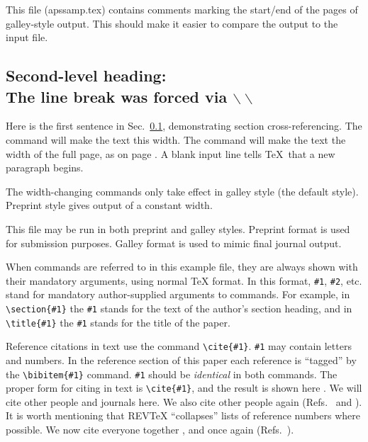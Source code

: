 This file (apssamp.tex) contains comments marking the start/end of the
pages of galley-style output. This should make it easier to compare the
output to the input file.

\subsection{Second-level heading:\protect\\ The line break was forced via
$\backslash\backslash$}
\label{sec:level2}

Here is the first sentence in Sec.\ \ref{sec:level2}, demonstrating
section cross-referencing.
The command 
will make the text this width. The command 
will make the text the width of the full page, as on page \pageref{wideeq}.
A blank input line tells \TeX\ that a new paragraph begins.

The width-changing commands only take effect in galley style (the default
style). Preprint style gives output of a constant width.

This file may be run in both preprint and galley styles. Preprint
format is used for submission purposes. Galley format is used to mimic
final journal output. 

When commands are referred to in this example file, they are always shown
with their mandatory arguments, using normal \TeX{} format. In this format,
\verb+#1+, \verb+#2+, etc. stand for mandatory
author-supplied arguments to commands.
For example, in
\verb+\section{#1}+ the \verb+#1+ stands for the text of the author's section
heading, and in \verb+\title{#1}+ the \verb+#1+ stands for the
title of the paper.


Reference citations in text use the command \verb+\cite{#1}+.
\verb+#1+ may contain letters and numbers.
In the reference section of this paper
each reference is ``tagged'' by the \verb+\bibitem{#1}+ command.
\verb+#1+ should be {\em identical\/} in both commands.
The proper form for citing in text is
\verb+\cite{#1}+,
and the result is shown here \cite{smith82,jones78}.
We will cite  other people \cite{smith82,jonessmith80}
and journals here. We also cite other people again (Refs.\
 and ).
It is worth mentioning that REV\TeX{} ``collapses'' lists
of reference numbers where possible.  We now cite
everyone together \cite{smith82,jones78,jonessmith80}, and once again
(Refs.\ \onlinecite{smith82,jones78,jonessmith80}).

